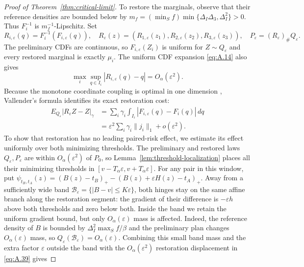 \begin{proof}[Proof of Theorem~\ref{thm:critical-limit}]
\label{step:marginal-restoration}
To restore the marginals, observe that their reference densities are bounded below by \(m_f=(\min_Sf)\min\{\Delta_I\Delta_3,\Delta_I^2\}>0\). Thus \(F_i^{-1}\) is \(m_f^{-1}\)-Lipschitz. Set
\begin{equation}
R_{i,\varepsilon}(q)=F_i^{-1}(F_{i,\varepsilon}(q)),\quad
R_\varepsilon(z)=(R_{1,\varepsilon}(z_1),R_{2,\varepsilon}(z_2),R_{3,\varepsilon}(z_3)),
\quad P_\varepsilon=(R_\varepsilon)_\#Q_\varepsilon.
\tag{A.38}\label{eq:A.38}
\end{equation}
The preliminary CDFs are continuous, so \(F_{i,\varepsilon}(Z_i)\) is uniform for \(Z\sim Q_\varepsilon\) and every restored marginal is exactly \(\mu_i\). The uniform CDF expansion \eqref{eq:A.14} also gives
\begin{equation}
\max_i\sup_{q\in I_i}|R_{i,\varepsilon}(q)-q|=O_\alpha(\varepsilon^2).
\tag{A.39}\label{eq:A.39}
\end{equation}
Because the monotone coordinate coupling is optimal in one dimension \cite[Chapter~2]{santambrogio2015}, Vallender's formula \cite{vallender1974} identifies its exact restoration cost:
\begin{equation}
\begin{aligned}
E_{Q_\varepsilon}|R_\varepsilon Z-Z|_\gamma
&=\sum_i\gamma_i\int_{I_i}|F_{i,\varepsilon}(q)-F_i(q)|\,dq\\
&=\varepsilon^2\sum_i\gamma_i\|j_i\|_1+o(\varepsilon^2).
\end{aligned}
\tag{A.40}\label{eq:A.40}
\end{equation}
To show that restoration has no leading paired-risk effect, we estimate its effect uniformly over both minimizing thresholds. The preliminary and restored laws \(Q_\varepsilon,P_\varepsilon\) are within \(O_\alpha(\varepsilon^2)\) of \(P_0\), so Lemma~\ref{lem:threshold-localization} places all their minimizing thresholds in \([v-T_\alpha\varepsilon,v+T_\alpha\varepsilon]\). For any pair in this window, put \(\psi_{t_B,t_A}(z)=(B(z)-t_B)_+-(B(z)+\varepsilon H(z)-t_A)_+\). Away from a sufficiently wide band \(\mathcal B_\varepsilon=\{|B-v|\le K\varepsilon\}\), both hinges stay on the same affine branch along the restoration segment: the gradient of their difference is \(-\varepsilon h\) above both thresholds and zero below both. Inside the band we retain the uniform gradient bound, but only \(O_\alpha(\varepsilon)\) mass is affected. Indeed, the reference density of \(B\) is bounded by \(\Delta_I^2\max_Sf/\beta\) and the preliminary plan changes \(O_\alpha(\varepsilon)\) mass, so \(Q_\varepsilon(\mathcal B_\varepsilon)=O_\alpha(\varepsilon)\). Combining this small band mass and the extra factor \(\varepsilon\) outside the band with the \(O_\alpha(\varepsilon^2)\) restoration displacement in \eqref{eq:A.39} gives

\end{proof}
